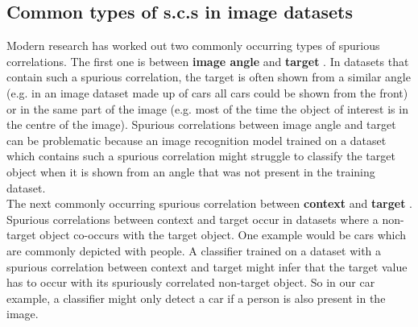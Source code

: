 \documentclass{article}
\begin{document}
\subsection{Common types of s.c.s in image datasets}
Modern research has worked out two commonly occurring types of spurious correlations. The first one is  between \textbf{image angle} and \textbf{target} \cite{5995347}. In datasets that contain such a spurious correlation, the target is often shown from a similar angle (e.g. in an image dataset made up of cars all cars could be shown from the front) or in the same part of the image (e.g. most of the time the object of interest is in the centre of the image). Spurious correlations between image angle and target can be problematic because an image recognition model trained on a dataset which contains such a spurious correlation might struggle to classify the target object when it is shown from an angle that was not present in the training dataset. \\
The next commonly occurring spurious correlation between \textbf{context} and \textbf{target} \cite{Singh_2020_CVPR}. Spurious correlations between context and target occur in datasets where a non-target object co-occurs with the target object. One example would be cars which are commonly depicted with people. A classifier trained on a dataset with a spurious correlation between context and target might infer that the target value has to occur with its spuriously correlated non-target object. So in our car example, a classifier might only detect a car if a person is also present in the image.
\end{document}
